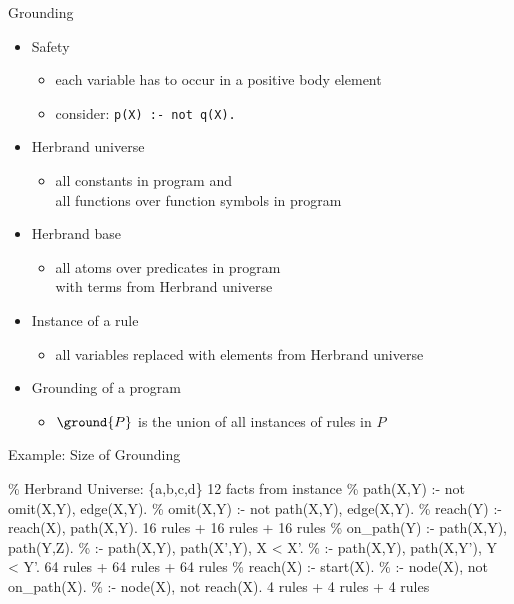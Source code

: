 \begin{frame}{Grounding}
  \begin{itemize}
    \item Safety
      \begin{itemize}
        \item each variable has to occur in a positive body element
        \item consider: \texttt{p(X) :- not q(X).}
      \end{itemize}
    \item Herbrand universe
      \begin{itemize}
        \item
          \alert{all constants} in program and\\
          \alert{all functions} over function symbols in program
      \end{itemize}
    \item Herbrand base
      \begin{itemize}
        \item \alert{all atoms} over predicates in program\\ with terms from Herbrand universe
      \end{itemize}
    \item Instance of a rule
      \begin{itemize}
        \item all variables replaced with elements from Herbrand universe
      \end{itemize}
    \item Grounding of a program
      \begin{itemize}
        \item \(\ground{P}\) is the union of all instances of %
              rules in \(P\)
      \end{itemize}
  \end{itemize}
\end{frame}

\begin{frame}[fragile]{Example: Size of Grounding}
  \begin{SemiVerbatim}{.9}
{\color{comment}\% Herbrand Universe: \{a,b,c,d\}}
12 facts from instance
{\color{comment}\% path(X,Y) :- not omit(X,Y), edge(X,Y).}
{\color{comment}\% omit(X,Y) :- not path(X,Y), edge(X,Y).}
{\color{comment}\% reach(Y) :- reach(X), path(X,Y).}
16 rules + 16 rules + 16 rules
{\color{comment}\% on_path(Y) :- path(X,Y), path(Y,Z).}
{\color{comment}\% :- path(X,Y), path(X',Y), X < X'.}
{\color{comment}\% :- path(X,Y), path(X,Y'), Y < Y'.}
64 rules + 64 rules + 64 rules
{\color{comment}\% reach(X) :- start(X).}
{\color{comment}\% :- node(X), not on_path(X).}
{\color{comment}\% :- node(X), not reach(X).}
4 rules + 4 rules + 4 rules
  \end{SemiVerbatim}
\end{frame}

